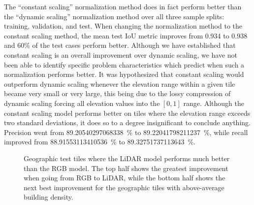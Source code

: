 The \enquote{constant scaling} normalization method does in fact perform better than the \enquote{dynamic scaling} normalization method over all three sample splits: training, validation, and test.
When changing the normalization method to the constant scaling method, the mean test IoU metric improves from \num{0.934} to \num{0.938} and 60\% of the test cases perform better.
Although we have established that constant scaling is an overall improvement over dynamic scaling, we have not been able to identify specific problem characteristics which predict when such a normalization performs better.
It was hypothesized that constant scaling would outperform dynamic scaling whenever the elevation range within a given tile became very small or very large, this being due to the lossy compression of dynamic scaling forcing all elevation values into the $[0, 1]$ range.
Although the constant scaling model performs better on tiles where the elevation range exceeds two standard deviations, it does so to a degree insignificant to conclude anything.
Precision went from \SI[round-mode=places,round-precision=2]{89.20540297068338}{\percent} to \SI[round-mode=places,round-precision=2]{89.22041798211237}{\percent}, while recall improved from \SI[round-mode=places,round-precision=2]{88.91553113410536}{\percent} to \SI[round-mode=places,round-precision=2]{89.32751737113643}{\percent}.

\begin{figure}[H]
  \centering
  \caption{%
    Geographic test tiles where the LiDAR model performs much better than the RGB model.
    The top half shows the greatest improvement when going from RGB to LiDAR, while the bottom half shows the next best improvement for the geographic tiles with above-average building density.
  }%
  \label{fig:constant-better-than-dynamic}
\end{figure}
